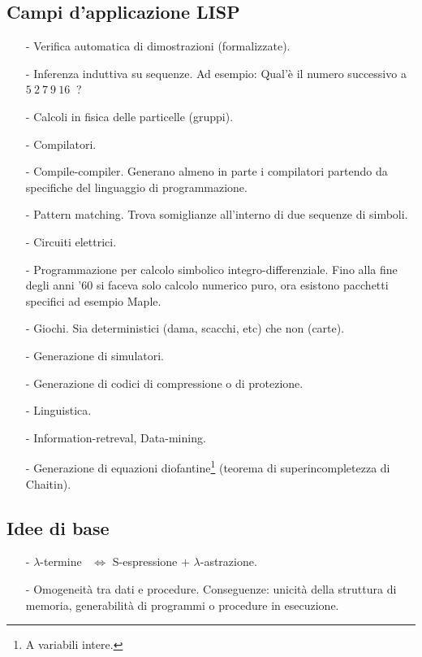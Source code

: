 \documentclass{book}
\newcommand*{\lbt}{$\lambda$-ter\-mi\-ne}
\begin{document}
\subsection{Campi d'applicazione LISP}
\begin{itemize}
\item[-]Verifica automatica di dimostrazioni (formalizzate).
\item[-]Inferenza induttiva su sequenze. Ad esempio:
Qual'\`e il numero successivo a $5\ 2\ 7\ 9\ 16\ $ ?

\item[-]Calcoli in fisica delle particelle (gruppi).
\item[-]Compilatori.
\item[-]Compile-compiler. Generano almeno in parte i compilatori partendo da
specifiche del linguaggio di programmazione.
\item[-]Pattern matching. Trova somiglianze all'interno di due sequenze di 
simboli.
\item[-]Circuiti elettrici.
\item[-]Programmazione per calcolo simbolico integro-differenziale. Fino alla
fine degli anni '60 si faceva solo calcolo numerico puro, ora esistono
pacchetti specifici ad esempio Maple.
\item[-]Giochi. Sia deterministici (dama, scacchi, etc) che non (carte).
\item[-]Generazione di simulatori.
\item[-]Generazione di codici di compressione o di protezione.
\item[-]Linguistica.
\item[-]Information-retreval, Data-mining.
\item[-]Generazione di equazioni diofantine\footnote{A variabili intere.} 
(teorema di superincompletezza di Chaitin).
\end{itemize}

\subsection{Idee di base}
\begin{itemize}
\item[-]\lbt~ $\Longleftrightarrow$ S-espressione $+$ $\lambda$-astrazione.
\item[-]Omogeneit\`a tra dati e procedure. Conseguenze: unicit\`a della
struttura di memoria, generabilit\`a di programmi o procedure in esecuzione.
\end{itemize}
\end{document}
